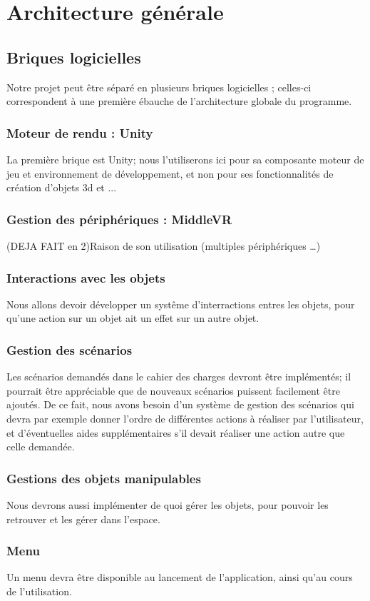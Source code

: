 \section{Architecture générale}
	\subsection{Briques logicielles}
		Notre projet peut être séparé en plusieurs briques logicielles ; celles-ci correspondent à une première ébauche de l'architecture globale du programme.
		\subsubsection{Moteur de rendu : Unity}
			La première brique est Unity; nous l'utiliserons ici pour sa composante moteur de jeu et environnement de développement, et non pour ses fonctionnalités de création d'objets 3d et ... 
		\subsubsection{Gestion des périphériques : MiddleVR}
			(DEJA FAIT en 2)Raison de son utilisation (multiples périphériques …)
		\subsubsection{Interactions avec les objets}
			Nous allons devoir développer un systême d'interractions entres les objets, pour qu'une action sur un objet ait un effet sur un autre objet.
		\subsubsection{Gestion des scénarios}
			Les scénarios demandés dans le cahier des charges devront être implémentés; il pourrait être appréciable que de nouveaux scénarios puissent facilement être ajoutés.
			De ce fait, nous avons besoin d'un système de gestion des scénarios qui devra par exemple donner l'ordre de différentes actions à réaliser par l'utilisateur, et d'éventuelles aides supplémentaires s'il devait réaliser une action autre que celle demandée.
		\subsubsection{Gestions des objets manipulables}
			Nous devrons aussi implémenter de quoi gérer les objets, pour pouvoir les retrouver et les gérer dans l'espace.
		\subsubsection{Menu}
			Un menu devra être disponible au lancement de l'application, ainsi qu'au cours de l'utilisation.

